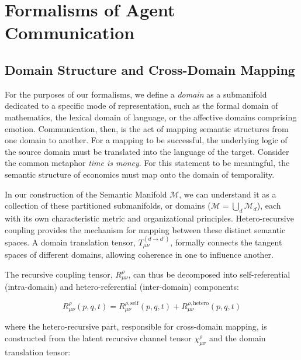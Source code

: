 \chapter{Formalisms of Agent Communication}
\label{14:formalisms_of_agent_communication}


\section{Domain Structure and Cross-Domain Mapping}
\label{14.1:domain_structure_and_cross_domain_mapping}

For the purposes of our formalisms, we define a \textit{domain} as a submanifold dedicated to a specific mode of representation, such as the formal domain of mathematics, the lexical domain of language, or the affective domains comprising emotion. Communication, then, is the act of mapping semantic structures from one domain to another. For a mapping to be successful, the underlying logic of the source domain must be translated into the language of the target. Consider the common metaphor \textit{time is money}. For this statement to be meaningful, the semantic structure of economics must map onto the domain of temporality.

In our construction of the Semantic Manifold \(\mathcal{M}\), we can understand it as a collection of these partitioned submanifolds, or domains (\(\mathcal{M} = \bigcup_d \mathcal{M}_d\)), each with its own characteristic metric and organizational principles. Hetero-recursive coupling provides the mechanism for mapping between these distinct semantic spaces. A domain translation tensor, \(T_{\mu\nu}^{(d \to d')}\), formally connects the tangent spaces of different domains, allowing coherence in one to influence another.

The recursive coupling tensor, \(R^\rho_{\mu\nu}\), can thus be decomposed into self-referential (intra-domain) and hetero-referential (inter-domain) components:

\begin{equation}
R^\rho_{\mu\nu}(p, q, t) = R^{\rho, \text{self}}_{\mu\nu}(p, q, t) + R^{\rho, \text{hetero}}_{\mu\nu}(p, q, t)
\end{equation}

where the hetero-recursive part, responsible for cross-domain mapping, is constructed from the latent recursive channel tensor \(\chi^\rho_{\mu\sigma}\) and the domain translation tensor:

